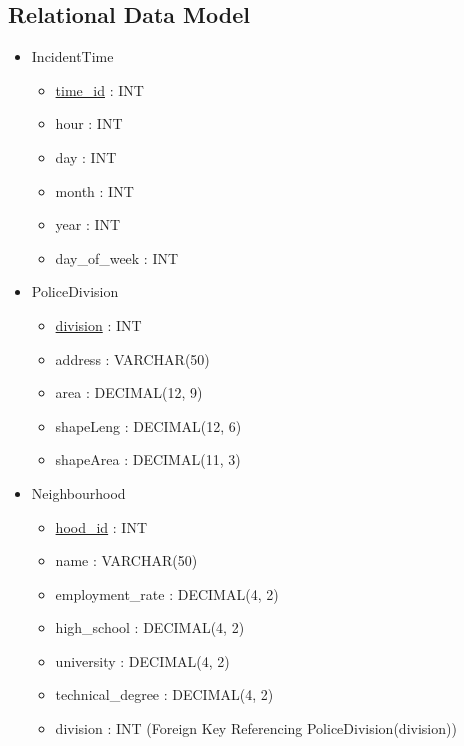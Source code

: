 \documentclass[12pt, a4paper]{article}
\begin{document}
\subsection*{Relational Data Model}
\begin{itemize}
    \item IncidentTime
    \begin{itemize}
        \item \underline{time\_id} : \color{blue} INT \color{black}
        \item hour : \color{blue} INT \color{black}
        \item day : \color{blue} INT \color{black}
        \item month : \color{blue} INT \color{black}
        \item year : \color{blue} INT \color{black}
        \item day\_of\_week : \color{blue} INT \color{black}
    \end{itemize}
    \item PoliceDivision
        \begin{itemize}
        \item \underline{division} : \color{blue} INT \color{black}
        \item address : \color{blue} VARCHAR(50) \color{black}
        \item area : \color{blue} DECIMAL(12, 9) \color{black}
        \item shapeLeng : \color{blue} DECIMAL(12, 6)  \color{black}
        \item shapeArea : \color{blue} DECIMAL(11, 3) \color{black}
    \end{itemize}
    \item Neighbourhood
        \begin{itemize}
        \item \underline{hood\_id} : \color{blue} INT \color{black}
        \item name : \color{blue} VARCHAR(50) \color{black}
        \color{blue}
        \item employment\_rate : DECIMAL(4, 2)
        \item high\_school : DECIMAL(4, 2)
        \item university : DECIMAL(4, 2) 
        \item technical\_degree : DECIMAL(4, 2) \color{black}
        \item division : \color{blue} INT \color{black} (Foreign Key Referencing  PoliceDivision(division))
    \end{itemize}

\end{itemize}
\end{document}
